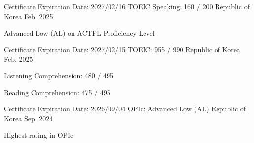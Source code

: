 

\begin{cventries}

  \cventry
    {Certificate Expiration Date: 2027/02/16} %
    {TOEIC Speaking: \href{https://drive.google.com/file/d/1HgNQ4gUgvdH7-rlSQieMzz84lg-ij9-u/view?usp=sharing}{160 / 200}} %
    {Republic of Korea} %
    {Feb. 2025} %
    {
      \begin{cvitems} %
        \item {Advanced Low (AL) on ACTFL Proficiency Level}
      \end{cvitems}
    }

  \cventry
    {Certificate Expiration Date: 2027/02/15} %
    {TOEIC: \href{https://drive.google.com/file/d/14gmf1MtT_eW6QlUEyug6A36HshiLP5mz/view?usp=sharing}{955 / 990}} %
    {Republic of Korea} %
    {Feb. 2025} %
    {
      \begin{cvitems} %
        \item {Listening Comprehension: 480 / 495}
        \item {Reading Comprehension: 475 / 495}
      \end{cvitems}
    }

  \cventry
    {Certificate Expiration Date: 2026/09/04} %
    {OPIc: \href{https://drive.google.com/file/d/1WA33mSp0jaU5LKnqtJ-dRN5UOLOgsfLA/view?usp=sharing}{Advanced Low (AL)}} %
    {Republic of Korea} %
    {Sep. 2024} %
    {
      \begin{cvitems} %
        \item {Highest rating in OPIc}
      \end{cvitems}
    }


\end{cventries}
